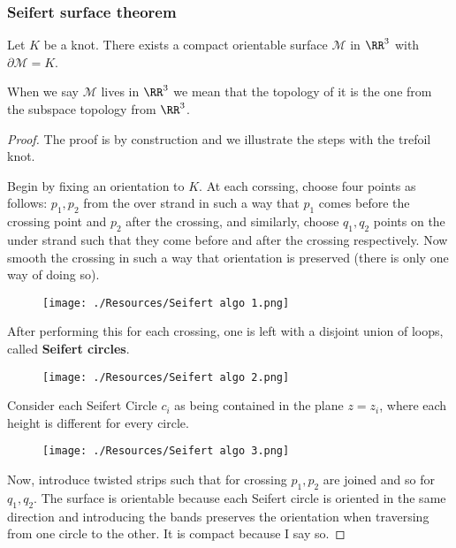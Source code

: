 \documentclass[12pt, a4paper]{article}
\begin{document}
\subsubsection{Seifert surface theorem}

\begin{mdthm}
    Let \(K\) be a knot. There exists a compact orientable surface \(\mathcal{M}\) in \(\RR^3\) with \(\partial \mathcal{M} =K\).
\end{mdthm}

\begin{mdremark}
    When we say \(\mathcal{M}\) lives in \(\RR^3\) we mean that the topology of it is the one from the subspace topology from \(\RR^3\).
\end{mdremark}

\begin{proof}
    The proof is by construction and we illustrate the steps with the trefoil knot.

    Begin by fixing an orientation to \(K\). At each corssing, choose four points as follows: \( p_1, p_2 \) from the over strand in such a way that \( p_1 \) comes before the crossing point and \( p_2 \) after the crossing, and similarly, choose \( q_1, q_2 \) points on the under strand such that they come before and after the crossing respectively. Now smooth the crossing in such a way that orientation is preserved (there is only one way of doing so).
    \begin{figure}[H]
         \begin{center}
             \texttt{[image: ./Resources/Seifert algo 1.png]}
         \end{center}
    \end{figure}
    After performing this for each crossing, one is left with a disjoint union of loops, called \textbf{Seifert circles}.
    \begin{figure}[H]
         \begin{center}
             \texttt{[image: ./Resources/Seifert algo 2.png]}
         \end{center}
    \end{figure}
    Consider each Seifert Circle \( c_i \) as being contained in the plane \( z = z_i \), where each height is different for every circle.
    \begin{figure}[H]
         \begin{center}
             \texttt{[image: ./Resources/Seifert algo 3.png]}
         \end{center}
    \end{figure}
    Now, introduce twisted strips such that for crossing \( p_1, p_2 \) are joined and so for \( q_1, q_2 \). The surface is orientable because each Seifert circle is oriented in the same direction and introducing the bands preserves the orientation when traversing from one circle to the other. It is compact because I say so.
\end{proof}
\end{document}
